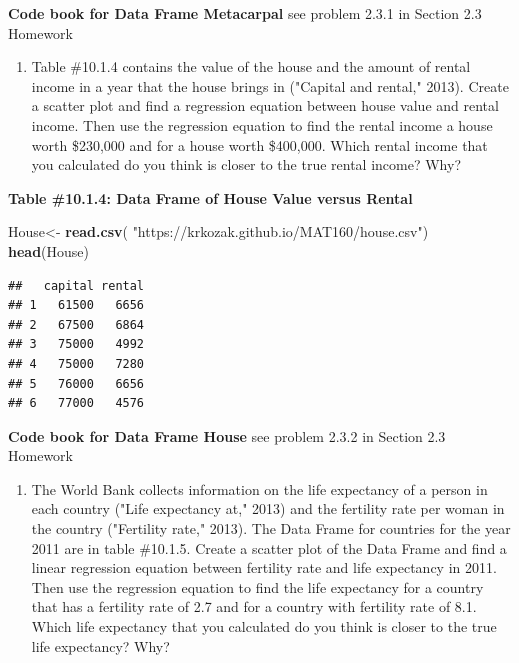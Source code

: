 \documentclass[
]{book}
\newenvironment{Shaded}{\begin{snugshade}}{\end{snugshade}}
\newcommand{\KeywordTok}[1]{\textcolor[rgb]{0.13,0.29,0.53}{\textbf{#1}}}
\newcommand{\NormalTok}[1]{#1}
\newcommand{\StringTok}[1]{\textcolor[rgb]{0.31,0.60,0.02}{#1}}
\providecommand{\tightlist}{%
  \setlength{\itemsep}{0pt}\setlength{\parskip}{0pt}}
\begin{document}
\textbf{Code book for Data Frame Metacarpal} see problem 2.3.1 in Section 2.3 Homework

\begin{enumerate}
\def\labelenumi{\arabic{enumi}.}
\setcounter{enumi}{1}
\tightlist
\item
  Table \#10.1.4 contains the value of the house and the amount of rental income in a year that the house brings in ("Capital and rental," 2013). Create a scatter plot and find a regression equation between house value and rental income. Then use the regression equation to find the rental income a house worth \$230,000 and for a house worth \$400,000. Which rental income that you calculated do you think is closer to the true rental income? Why?
\end{enumerate}

\textbf{Table \#10.1.4: Data Frame of House Value versus Rental}

\begin{Shaded}
\begin{Highlighting}[]
\NormalTok{House<-}\StringTok{ }\KeywordTok{read.csv}\NormalTok{(}
  \StringTok{"https://krkozak.github.io/MAT160/house.csv"}\NormalTok{)}
\KeywordTok{head}\NormalTok{(House)}
\end{Highlighting}
\end{Shaded}

\begin{verbatim}
##   capital rental
## 1   61500   6656
## 2   67500   6864
## 3   75000   4992
## 4   75000   7280
## 5   76000   6656
## 6   77000   4576
\end{verbatim}

\textbf{Code book for Data Frame House} see problem 2.3.2 in Section 2.3 Homework

\begin{enumerate}
\def\labelenumi{\arabic{enumi}.}
\setcounter{enumi}{2}
\tightlist
\item
  The World Bank collects information on the life expectancy of a person in each country ("Life expectancy at," 2013) and the fertility rate per woman in the country ("Fertility rate," 2013). The Data Frame for countries for the year 2011 are in table \#10.1.5. Create a scatter plot of the Data Frame and find a linear regression equation between fertility rate and life expectancy in 2011. Then use the regression equation to find the life expectancy for a country that has a fertility rate of 2.7 and for a country with fertility rate of 8.1. Which life expectancy that you calculated do you think is closer to the true life expectancy? Why?
\end{enumerate}
\end{document}

